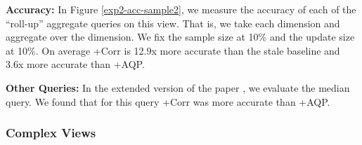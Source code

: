 \textbf{Accuracy: }
In Figure \ref{exp2-acc-sample2}, we measure the accuracy of each of the ``roll-up'' aggregate queries on this view.
That is, we take each dimension and aggregate over the dimension.
We fix the sample size at 10\% and the update size at 10\%.
On average \svcnospace+Corr is 12.9x more accurate than the stale baseline and 3.6x more accurate than \svcnospace+AQP. 


\textbf{Other Queries: } In the extended version of the paper \cite{technicalReport}, we evaluate the median query. We found that for this query \svcnospace+Corr was more accurate than \svcnospace+AQP.

\subsubsection{Complex Views}

